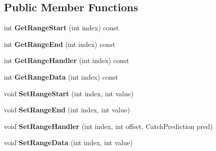 \subsection*{Public Member Functions}
\begin{DoxyCompactItemize}
\item 
int {\bfseries Get\+Range\+Start} (int index) const \hypertarget{classv8_1_1internal_1_1_handler_table_a51c4a84e38871984a0581b1e80e6fadf}{}\label{classv8_1_1internal_1_1_handler_table_a51c4a84e38871984a0581b1e80e6fadf}

\item 
int {\bfseries Get\+Range\+End} (int index) const \hypertarget{classv8_1_1internal_1_1_handler_table_a23fe20fb97348e67fb6d230b9a41f46e}{}\label{classv8_1_1internal_1_1_handler_table_a23fe20fb97348e67fb6d230b9a41f46e}

\item 
int {\bfseries Get\+Range\+Handler} (int index) const \hypertarget{classv8_1_1internal_1_1_handler_table_a844e84285e9ac236cc35e87d70a365b5}{}\label{classv8_1_1internal_1_1_handler_table_a844e84285e9ac236cc35e87d70a365b5}

\item 
int {\bfseries Get\+Range\+Data} (int index) const \hypertarget{classv8_1_1internal_1_1_handler_table_a1f691352bd8516909d64aeb176977b4d}{}\label{classv8_1_1internal_1_1_handler_table_a1f691352bd8516909d64aeb176977b4d}

\item 
void {\bfseries Set\+Range\+Start} (int index, int value)\hypertarget{classv8_1_1internal_1_1_handler_table_af003cc15ae2f99122d0dca3f8777b18c}{}\label{classv8_1_1internal_1_1_handler_table_af003cc15ae2f99122d0dca3f8777b18c}

\item 
void {\bfseries Set\+Range\+End} (int index, int value)\hypertarget{classv8_1_1internal_1_1_handler_table_aa42488039d1e1fea69fda47b7f2f045f}{}\label{classv8_1_1internal_1_1_handler_table_aa42488039d1e1fea69fda47b7f2f045f}

\item 
void {\bfseries Set\+Range\+Handler} (int index, int offset, Catch\+Prediction pred)\hypertarget{classv8_1_1internal_1_1_handler_table_a683448668d43ac5c6352c6d2c66fa2d7}{}\label{classv8_1_1internal_1_1_handler_table_a683448668d43ac5c6352c6d2c66fa2d7}

\item 
void {\bfseries Set\+Range\+Data} (int index, int value)\hypertarget{classv8_1_1internal_1_1_handler_table_aa2afe5c8c465265e1150587dc5134b66}{}\label{classv8_1_1internal_1_1_handler_table_aa2afe5c8c465265e1150587dc5134b66}


\end{DoxyCompactItemize}
